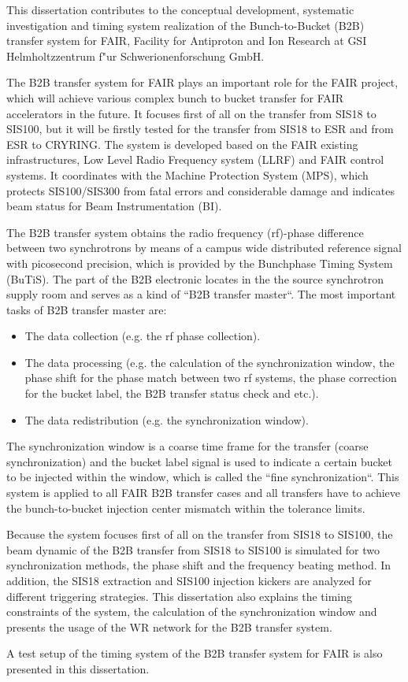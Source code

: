 This dissertation contributes to the conceptual development, systematic investigation and timing system realization of the Bunch-to-Bucket (B2B) transfer system for FAIR, Facility for Antiproton and Ion Research at GSI Helmholtzzentrum f"ur Schwerionenforschung GmbH. 

The B2B transfer system for FAIR plays an important role for the FAIR project, which will achieve various complex bunch to bucket transfer for FAIR accelerators in the future. It focuses first of all on the transfer from SIS18 to SIS100, but it will be firstly tested for the transfer from SIS18 to ESR and from ESR to CRYRING. The system is developed based on the FAIR existing infrastructures, Low Level Radio Frequency system (LLRF) and FAIR control systems. It coordinates with the Machine Protection System (MPS), which protects SIS100/SIS300 from fatal errors and considerable damage and indicates beam status for Beam Instrumentation (BI). 
 
The B2B transfer system obtains the radio frequency (rf)-phase difference between two synchrotrons by means of a campus wide distributed reference signal with picosecond precision, which is provided by the Bunchphase Timing System (BuTiS). The part of the B2B electronic locates in the the source synchrotron supply room and serves as a kind of ``B2B transfer master``. The most important tasks of B2B transfer master are:
\begin{itemize}

	\item 	The data collection (e.g. the rf phase collection). 

   \item 	The data processing (e.g. the calculation of the synchronization window, the phase shift for the phase match between two rf systems, the phase correction for the bucket label, the B2B transfer status check and etc.). 

   \item 	The data redistribution (e.g. the synchronization window).
\end{itemize}
The synchronization window is a coarse time frame for the transfer (coarse synchronization) and the bucket label signal is used to indicate a certain bucket to be injected within the window, which is called the ``fine synchronization``. This system is applied to all FAIR B2B transfer cases and all transfers have to achieve the bunch-to-bucket injection center mismatch within the tolerance limits.

Because the system focuses first of all on the transfer from SIS18 to SIS100, the beam dynamic of the B2B transfer from SIS18 to SIS100 is simulated for two synchronization methods, the phase shift and the frequency beating method. In addition, the SIS18 extraction and SIS100 injection kickers are analyzed for different triggering strategies. This dissertation also explains the timing constraints of the system, the calculation of the synchronization window and presents the usage of the WR network for the B2B transfer system. 

A test setup of the timing system of the B2B transfer system for FAIR is also presented in this dissertation. 
